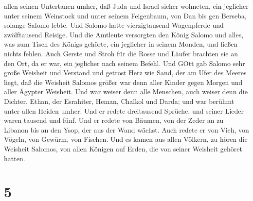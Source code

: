 allen seinen Untertanen umher,  daß Juda und Israel sicher
wohneten, ein jeglicher unter seinem Weinstock und unter seinem
Feigenbaum, von Dan bis gen Berseba, solange Salomo lebte. 
Und Salomo hatte vierzigtausend Wagenpferde und zwölftausend Reisige.
 Und die Amtleute versorgten den König Salomo und alles,
was zum Tisch des Königs gehörte, ein jeglicher in seinem Monden, und
ließen nichts fehlen.  Auch Gerste und Stroh für die Rosse
und Läufer brachten sie an den Ort, da er war, ein jeglicher nach seinem
Befehl.  Und GOtt gab Salomo sehr große Weisheit und
Verstand und getrost Herz wie Sand, der am Ufer des Meeres liegt,
 daß die Weisheit Salomos größer war denn aller Kinder
gegen Morgen und aller Ägypter Weisheit.  Und war weiser
denn alle Menschen, auch weiser denn die Dichter, Ethan, der Esrahiter,
Heman, Chalkol und Darda; und war berühmt unter allen Heiden umher.
 Und er redete dreitausend Sprüche, und seiner Lieder waren
tausend und fünf.  Und er redete von Bäumen, von der Zeder
an zu Libanon bis an den Ysop, der aus der Wand wächst. Auch redete er
von Vieh, von Vögeln, von Gewürm, von Fischen.  Und es
kamen aus allen Völkern, zu hören die Weisheit Salomos, von allen
Königen auf Erden, die von seiner Weisheit gehöret hatten.

\hypertarget{section-4}{%
\section{5}\label{section-4}}

